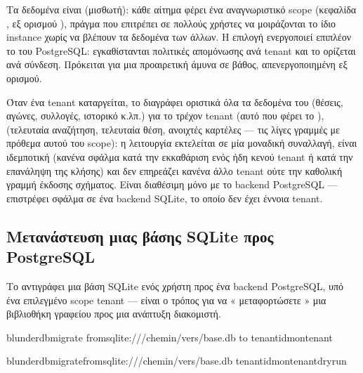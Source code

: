 \documentclass[letterpaper,10pt,greek]{sphinxmanual}
\begin{document}
\sphinxAtStartPar
Τα δεδομένα είναι  (μισθωτή): κάθε αίτημα φέρει ένα αναγνωριστικό scope (κεφαλίδα , εξ ορισμού ), πράγμα που επιτρέπει σε πολλούς χρήστες να μοιράζονται το ίδιο instance χωρίς να βλέπουν τα δεδομένα των άλλων. Η επιλογή  ενεργοποιεί επιπλέον το  του PostgreSQL: εγκαθίστανται πολιτικές απομόνωσης ανά tenant και το  ορίζεται ανά σύνδεση. Πρόκειται για μια προαιρετική άμυνα σε βάθος, απενεργοποιημένη εξ ορισμού.

\sphinxAtStartPar
Όταν ένα tenant καταργείται, το  διαγράφει οριστικά όλα τα δεδομένα του (θέσεις, αγώνες, συλλογές, ιστορικό κ.λπ.) για το τρέχον tenant (αυτό που φέρει το ),  (τελευταία αναζήτηση, τελευταία θέση, ανοιχτές καρτέλες — τις λίγες γραμμές  με πρόθεμα αυτού του scope): η λειτουργία εκτελείται σε μία μοναδική συναλλαγή, είναι ιδεμποτική (κανένα σφάλμα κατά την εκκαθάριση ενός ήδη κενού tenant ή κατά την επανάληψη της κλήσης) και δεν επηρεάζει κανένα άλλο tenant ούτε την καθολική γραμμή έκδοσης σχήματος. Είναι διαθέσιμη μόνο με το backend PostgreSQL — επιστρέφει σφάλμα  σε ένα backend SQLite, το οποίο δεν έχει έννοια tenant.


\subsection{Μετανάστευση μιας βάσης SQLite προς PostgreSQL}
\label{\detokenize{mode_headless:migrer-une-base-sqlite-vers-postgresql}}\label{\detokenize{mode_headless:headless-migrate}}
\sphinxAtStartPar
Το  αντιγράφει μια βάση SQLite ενός χρήστη προς ένα backend PostgreSQL, υπό ένα επιλεγμένο scope tenant — είναι ο τρόπος για να « μεταφορτώσετε » μια βιβλιοθήκη γραφείου προς μια ανάπτυξη διακομιστή.

\begin{sphinxVerbatim}[commandchars=\\\{\}]
blunderdbmigrate
\PYGZhy{}\PYGZhy{}fromsqlite:///chemin/vers/base.db
\PYGZhy{}\PYGZhy{}to
\PYGZhy{}\PYGZhy{}tenant\PYGZhy{}idmon\PYGZhy{}tenant

blunderdbmigrate\PYGZhy{}\PYGZhy{}fromsqlite:///chemin/vers/base.db
\PYGZhy{}\PYGZhy{}tenant\PYGZhy{}idmon\PYGZhy{}tenant\PYGZhy{}\PYGZhy{}dry\PYGZhy{}run
\end{sphinxVerbatim}
\end{document}
